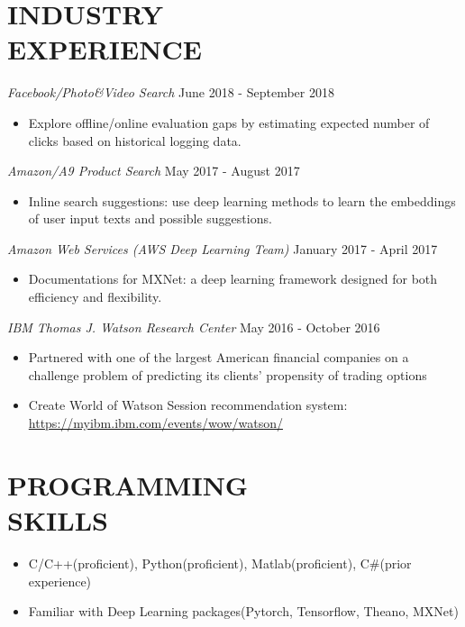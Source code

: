 \documentclass[margin, 10pt]{res} %
\begin{document}
\begin{resume}
\section{INDUSTRY\\EXPERIENCE}
{\sl Facebook/Photo\&Video Search} \hfill June 2018 - September 2018
\begin{itemize}
  \item Explore offline/online evaluation gaps by estimating expected number of 
    clicks based on historical logging data.
\end{itemize}
{\sl Amazon/A9 Product Search} \hfill May 2017 - August 2017
\begin{itemize}
  \item Inline search suggestions: use deep learning methods to learn the embeddings 
    of user input texts and possible suggestions.
\end{itemize}
{\sl Amazon Web Services (AWS Deep Learning Team)} \hfill January 2017 - April 2017
\begin{itemize}
  \item Documentations for MXNet: a deep learning framework designed for 
    both efficiency and flexibility.
  \end{itemize}
{\sl IBM Thomas J. Watson Research Center} \hfill May 2016 - October 2016
\begin{itemize}
\item  %
  Partnered with one of the largest American financial companies on a challenge problem of predicting its clients' propensity of trading options
\item Create World of Watson Session recommendation system:\\
  \url{https://myibm.ibm.com/events/wow/watson/}
\end{itemize} 


\section{PROGRAMMING \\ SKILLS} 
\begin{itemize}
	\item[]  C/C++(proficient), Python(proficient), Matlab(proficient), C\#(prior experience)
  \item[]  Familiar with Deep Learning packages(Pytorch, Tensorflow, Theano, MXNet)
\end{itemize}

\end{resume}
\end{document}
